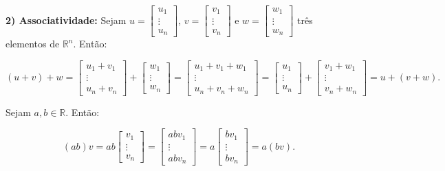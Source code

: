 \begin{Proof}
	\textbf{2) Associatividade:} Sejam $u = \begin{bmatrix}
		u_1 \\
		\vdots \\
		u_n
	\end{bmatrix}$, $v = \begin{bmatrix}
		v_1 \\
		\vdots \\
		v_n
	\end{bmatrix}$ e $w = \begin{bmatrix}
		w_1 \\
		\vdots \\
		w_n
	\end{bmatrix}$ três elementos de $\mathbb{R}^n$. Então:
	
	$$
	(u + v) + w = \begin{bmatrix}
		u_1 + v_1 \\
		\vdots \\
		u_n + v_n
	\end{bmatrix} + \begin{bmatrix}
	w_1 \\
	\vdots \\
	w_n
	\end{bmatrix} = \begin{bmatrix}
		u_1 + v_1 + w_1 \\
		\vdots \\
		u_n + v_n + w_n
	\end{bmatrix} = \begin{bmatrix}
		u_1 \\
		\vdots \\
		u_n
	\end{bmatrix} + \begin{bmatrix}
		v_1 + w_1 \\
		\vdots \\
		v_n + w_n
	\end{bmatrix} = u + (v + w).
	$$
	
	Sejam $a, b\in\mathbb{R}$. Então:
	
	$$
	(ab)v = ab\begin{bmatrix}
		v_1 \\
		\vdots \\
		v_n
	\end{bmatrix} = \begin{bmatrix}
		abv_1 \\
		\vdots \\
		abv_n
	\end{bmatrix} = a\begin{bmatrix}
		bv_1 \\
		\vdots \\
		bv_n
	\end{bmatrix} = a(bv).
	$$
	

\end{Proof}
